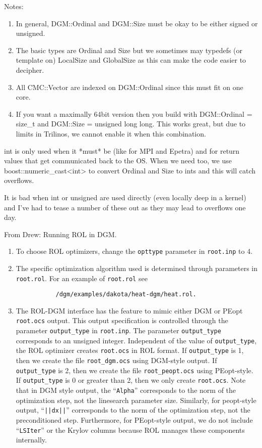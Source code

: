 \documentclass{report}
\begin{document}
Notes:
\begin{enumerate}
  \item In general, DGM::Ordinal and DGM::Size must be okay to be either
        signed or unsigned.
  \item The basic types are Ordinal and Size but we sometimes may typedefs
        (or template on) LocalSize and GlobalSize as this can make the code
        easier to decipher.
  \item All CMC::Vector are indexed on DGM::Ordinal since this must fit on
        one core.
  \item If you want a maximally 64bit version then you build with
        DGM::Ordinal = size\_t and DGM::Size = unsigned long long.
        This works great, but due to limits in Trilinos, we cannot
        enable it when this combination.
\end{enumerate}

int is only used when it *must* be (like for MPI and Epetra) and for
return values that get communicated back to the OS.  When we need too, we
use boost::numeric\_cast<int> to convert Ordinal and Size to ints and this
will catch overflows.

It is bad when int or unsigned are used directly (even locally deep in a
kernel) and I've had to tease a number of these out as they may lead to
overflows one day.

From Drew: Running ROL in DGM.  
\begin{enumerate}
  \item To choose ROL optimizers, change the {\tt opttype} parameter in {\tt root.inp} 
        to 4.
  \item The specific optimization algorithm used is determined through parameters 
        in {\tt root.rol}.  For an example of {\tt root.rol} see 
        \begin{verbatim}
           /dgm/examples/dakota/heat-dgm/heat.rol.
        \end{verbatim} 
  \item The ROL-DGM interface has the feature to mimic either DGM or PEopt {\tt root.ocs} 
        output.  This output specification is controlled through the parameter 
        {\tt output\_type} in {\tt root.inp}.  The parameter {\tt output\_type} corresponds 
        to an unsigned integer.  Independent of the value of {\tt output\_type}, the ROL 
        optimizer creates {\tt root.ocs} in ROL format.  If {\tt output\_type} is 1, then 
        we create the file {\tt root\_dgm.ocs} using DGM-style output.  If {\tt output\_type} 
        is 2, then we create the file {\tt root\_peopt.ocs} using PEopt-style.  If 
        {\tt output\_type} is 0 or greater than 2, then we only create {\tt root.ocs}.  Note 
        that in DGM style output, the ``{\tt Alpha}'' corresponds to the norm of the 
        optimization step, not the linesearch parameter size.  Similarly, for peopt-style 
        output, ``{\tt ||dx||}'' corresponds to the norm of the optimization step, not the 
        preconditioned step.  Furthermore, for PEopt-style output, we do not include 
        ``{\tt LSIter}'' or the Krylov columns because ROL manages these components internally.    
\end{enumerate}
\end{document}
